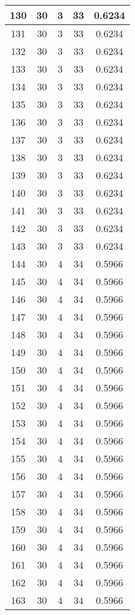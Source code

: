 \documentclass[letterpaper, 12pt]{article}
\begin{document}
\begin{longtable}{|c|c|c|c|c|}
\hline
130 & 30 & 3 & 33 & 0.6234 \\
\hline
131 & 30 & 3 & 33 & 0.6234 \\
\hline
132 & 30 & 3 & 33 & 0.6234 \\
\hline
133 & 30 & 3 & 33 & 0.6234 \\
\hline
134 & 30 & 3 & 33 & 0.6234 \\
\hline
135 & 30 & 3 & 33 & 0.6234 \\
\hline
136 & 30 & 3 & 33 & 0.6234 \\
\hline
137 & 30 & 3 & 33 & 0.6234 \\
\hline
138 & 30 & 3 & 33 & 0.6234 \\
\hline
139 & 30 & 3 & 33 & 0.6234 \\
\hline
140 & 30 & 3 & 33 & 0.6234 \\
\hline
141 & 30 & 3 & 33 & 0.6234 \\
\hline
142 & 30 & 3 & 33 & 0.6234 \\
\hline
143 & 30 & 3 & 33 & 0.6234 \\
\hline
144 & 30 & 4 & 34 & 0.5966 \\
\hline
145 & 30 & 4 & 34 & 0.5966 \\
\hline
146 & 30 & 4 & 34 & 0.5966 \\
\hline
147 & 30 & 4 & 34 & 0.5966 \\
\hline
148 & 30 & 4 & 34 & 0.5966 \\
\hline
149 & 30 & 4 & 34 & 0.5966 \\
\hline
150 & 30 & 4 & 34 & 0.5966 \\
\hline
151 & 30 & 4 & 34 & 0.5966 \\
\hline
152 & 30 & 4 & 34 & 0.5966 \\
\hline
153 & 30 & 4 & 34 & 0.5966 \\
\hline
154 & 30 & 4 & 34 & 0.5966 \\
\hline
155 & 30 & 4 & 34 & 0.5966 \\
\hline
156 & 30 & 4 & 34 & 0.5966 \\
\hline
157 & 30 & 4 & 34 & 0.5966 \\
\hline
158 & 30 & 4 & 34 & 0.5966 \\
\hline
159 & 30 & 4 & 34 & 0.5966 \\
\hline
160 & 30 & 4 & 34 & 0.5966 \\
\hline
161 & 30 & 4 & 34 & 0.5966 \\
\hline
162 & 30 & 4 & 34 & 0.5966 \\
\hline
163 & 30 & 4 & 34 & 0.5966 \\

\end{longtable}
\end{document}
